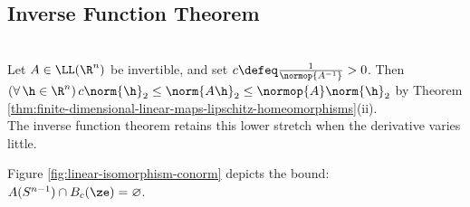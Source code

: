 \subsection{Inverse Function Theorem}

%

\begin{perspective} \label{per:linear-inverse-lower-bound} \\
Let $A\in\LL(\R^n)$ be invertible, and set $c\defeq\frac{1}{\normop{A^{-1}}}>0$. Then $(\forall\,\h\in\R^n)\,c\norm{\h}_2\leq\norm{A\h}_2\leq\normop{A}\norm{\h}_2$ by Theorem \ref{thm:finite-dimensional-linear-maps-lipschitz-homeomorphisms}(ii).\\
The inverse function theorem retains this lower stretch when the derivative varies little.
\end{perspective}

\noindent Figure \ref{fig:linear-isomorphism-conorm} depicts the bound: $A(S^{n-1})\cap B_c(\ze)=\varnothing$.
\begin{illustrationfigure}[H]
  \centering
  
  \caption{The image $A(S^{n-1})$ stays outside $B_c(\ze)$, where $c=\frac{1}{\normop{A^{-1}}}$.}
  \label{fig:linear-isomorphism-conorm}
\end{illustrationfigure}

